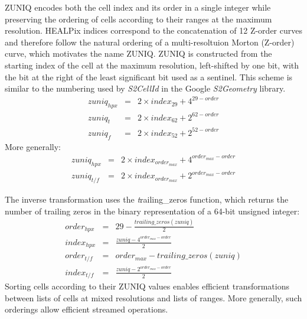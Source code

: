 ZUNIQ encodes both the cell index and its order in a single integer while preserving the
ordering of cells according to their ranges at the maximum resolution.
HEALPix indices correspond to the concatenation of 12 Z-order curves and therefore follow the
natural ordering of a multi-resoltuion Morton (Z-order) curve, which motivates the name ZUNIQ.
ZUNIQ is constructed from the starting index of the cell at the maximum resolution, left-shifted by one bit,
with the bit at the right of the least significant bit used as a sentinel.
This scheme is similar to the numbering used by
\textit{S2CellId} in the Google \textit{S2Geometry} library.
\begin{eqnarray*}
  zuniq_{hpx} & = & 2 \times index_{29} + 4^{29-order}\\
  zuniq_{t}   & = & 2 \times index_{62} + 2^{62-order}\\
  zuniq_{f}   & = & 2 \times index_{52} + 2^{52-order}
\end{eqnarray*}
More generally:
\begin{eqnarray*}
  zuniq_{hpx} & = & 2 \times index_{order_{max}} + 4^{order_{max}-order} \\
  zuniq_{t/f} & = & 2 \times index_{order_{max}} + 2^{order_{max}-order}
\end{eqnarray*}

The inverse transformation uses the {\textit trailing\_zeros} function,
which returns the number of trailing zeros in the binary representation of a 64-bit unsigned integer:
\begin{eqnarray*}
  order_{hpx} & = & 29 - \frac{trailing\_zeros(zuniq)}{2} \\
  index_{hpx} & = & \frac{zuniq - 4^{order_{max}-order}}{2} \\
  order_{t/f} & = & order_{max} - trailing\_zeros(zuniq) \\
  index_{t/f} & = & \frac{zuniq - 2^{order_{max}-order}}{2}
\end{eqnarray*}
Sorting cells according to their ZUNIQ values enables efficient transformations between lists of cells
at mixed resolutions and lists of ranges.
More generally, such orderings allow efficient streamed operations.
